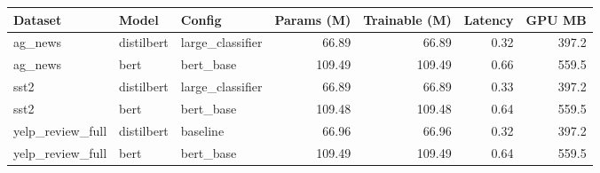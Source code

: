 \begin{tabular}{lllrrrr}
\toprule
Dataset & Model & Config & Params (M) & Trainable (M) & Latency & GPU MB \\
\midrule
ag\_news & distilbert & large\_classifier & 66.89 & 66.89 & 0.32 & 397.2 \\
ag\_news & bert & bert\_base & 109.49 & 109.49 & 0.66 & 559.5 \\
sst2 & distilbert & large\_classifier & 66.89 & 66.89 & 0.33 & 397.2 \\
sst2 & bert & bert\_base & 109.48 & 109.48 & 0.64 & 559.5 \\
yelp\_review\_full & distilbert & baseline & 66.96 & 66.96 & 0.32 & 397.2 \\
yelp\_review\_full & bert & bert\_base & 109.49 & 109.49 & 0.64 & 559.5 \\
\bottomrule
\end{tabular}
